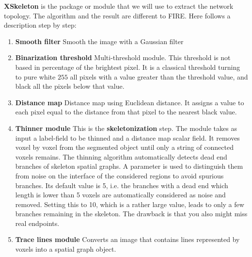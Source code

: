\textbf{XSkeleton} is the package or module that we will use to extract the
network topology. The algorithm and the result are different to FIRE. Here
follows a description step by step:
\begin{enumerate}[label=\textbf{\Alph*}]
 \item\textbf{Smooth filter} Smooth the image with a Gaussian filter
 \item\textbf{Binarization threshold} Multi-threshold module. This threshold is
 not based in percentage of the brightest pixel. It is a classical threshold turning
 to pure white $255$ all pixels with a value greater than the
 threshold value, and black all the pixels below that value.
 \item\textbf{Distance map} Distance map using Euclidean distance. It assigns a
 value to each pixel equal to the distance from that pixel to the nearest black value.
 \item\textbf{Thinner module} This is the \textbf{skeletonization} step. The
 module takes as input a label-field to be thinned and a distance map scalar field. It removes voxel by voxel from the segmented
 object until only a string of connected voxels remains.
 The thinning algorithm automatically detects dead end branches of skeleton
 spatial graphs. A parameter is used to distinguish them from noise on the
 interface  of the considered regions to avoid spurious branches.  Its default
 value is 5, i.e. the branches with a dead end which length is lower  than 5
 voxels are automatically considered as noise and removed.  Setting this to 10,
 which is a rather large value, leads to only a few branches remaining in the
 skeleton.  The drawback is that you also might miss real endpoints.

\item\textbf{Trace lines module} Converts an image that contains lines
represented by voxels into a spatial graph object.

 \end{enumerate}

